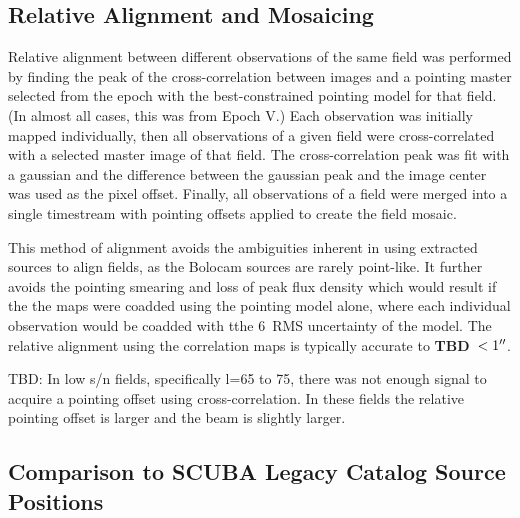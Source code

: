 \documentclass[12pt,preprint]{aastex}
\newcommand{\TBD}{{\bf TBD}}
\begin{document}
\subsection{Relative Alignment and Mosaicing}

Relative alignment between different observations of the same field
was performed by finding the peak of the cross-correlation between
images and a pointing master selected from the epoch with the
best-constrained pointing model for that field. (In almost all cases,
this was from Epoch V.)  Each observation was initially mapped
individually, then all observations of a given field were
cross-correlated with a selected master image of that field. The
cross-correlation peak was fit with a gaussian and the difference
between the gaussian peak and the image center was used as the pixel
offset. 
Finally, all observations of a field were merged into a single
timestream with pointing offsets applied to create the field mosaic.

This method of alignment avoids the ambiguities inherent in using
extracted sources to align fields, as the Bolocam sources are rarely
point-like.  It further avoids the pointing smearing and loss of peak
flux density which would result if the the maps were coadded using the
pointing model alone, where each individual observation would be
coadded with tthe 6\arcsec\ RMS uncertainty of the model.  The
relative alignment using the correlation maps is typically accurate to
\TBD\ $<1\mbox{$^{\prime\prime}$}$.

TBD: In low s/n fields, specifically l=65 to 75, there was not enough signal to
acquire a pointing offset using cross-correlation.  In these fields the
relative pointing offset is larger and the beam is slightly larger.

\subsection{Comparison to SCUBA Legacy Catalog Source Positions}
\label{sec:SCUBAPointingComparison}
\end{document}
